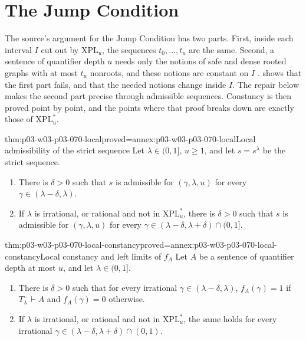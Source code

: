 \section{The Jump Condition}
\label{sec:p03-w03-p03-070-jump}

The source's argument for the Jump Condition has two parts.  First, inside
each interval \(I\) cut out by \(\mathrm{XPL}_u\), the sequences
\(t_0,\ldots,t_u\) are the same.  Second, a sentence of quantifier depth
\(u\) needs only the notions of safe and dense rooted graphs with at most
\(t_u\) nonroots, and these notions are constant on \(I\)
\cite[p.~19]{Spencer2007LogicRandomStructuresAuthor}.
 shows that the first part fails, and
that the needed notions change inside \(I\).  The repair below makes the
second part precise through admissible sequences.  Constancy is then proved
point by point, and the points where that proof breaks down are exactly
those of \(\mathrm{XPL}^\ast_u\).

\begin{hblemma}{thm:p03-w03-p03-070-local}{proved=annex:p03-w03-p03-070-local}{Local admissibility of the strict sequence}
Let \(\lambda\in(0,1]\), \(u\geq1\), and let \(s=s^\lambda\) be the strict
sequence.
\begin{enumerate}
\item There is \(\delta>0\) such that \(s\) is admissible for
      \((\gamma,\lambda,u)\) for every \(\gamma\in(\lambda-\delta,\lambda)\).
\item If \(\lambda\) is irrational, or rational and not in
      \(\mathrm{XPL}^\ast_u\), there is \(\delta>0\) such that \(s\) is
      admissible for \((\gamma,\lambda,u)\) for every
      \(\gamma\in(\lambda-\delta,\lambda+\delta)\cap(0,1]\).
\end{enumerate}
\end{hblemma}

\begin{hbtheorem}{thm:p03-w03-p03-070-local-constancy}{proved=annex:p03-w03-p03-070-local-constancy}{Local constancy and left limits of \(f_A\)}
Let \(A\) be a sentence of quantifier depth at most \(u\), and let
\(\lambda\in(0,1]\).
\begin{enumerate}
\item There is \(\delta>0\) such that for every irrational
      \(\gamma\in(\lambda-\delta,\lambda)\), \(f_A(\gamma)=1\) if
      \(T^-_\lambda\vdash A\) and \(f_A(\gamma)=0\) otherwise.
\item If \(\lambda\) is irrational, or rational and not in
      \(\mathrm{XPL}^\ast_u\), the same holds for every irrational
      \(\gamma\in(\lambda-\delta,\lambda+\delta)\cap(0,1)\).
\end{enumerate}
\end{hbtheorem}

